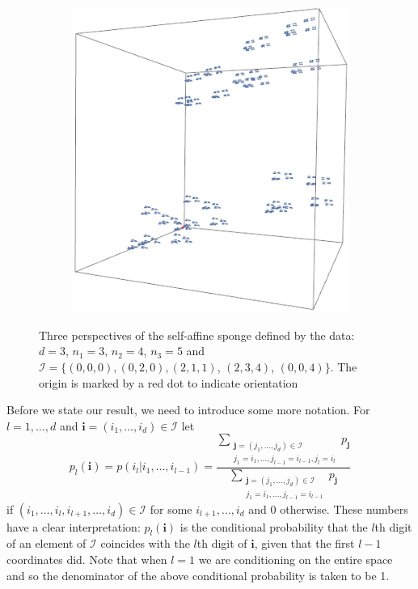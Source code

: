 \begin{figure}[h]
	\begin{subfigure}{0.35\textwidth}
		\centering
		\includegraphics[width=0.85\linewidth]{pics/ch-upper-reg/sponge13.png}
		\label{ch-upper-reg:fig:sub2}
	\end{subfigure}
	\caption{Three perspectives of the self-affine sponge defined by the data: $d=3$,  $n_1=3$, $n_2=4$, $n_3=5$ and $\mathcal{I} = \{ (0,0,0),(0,2,0),(2,1,1)$, $(2,3,4)$, $(0,0,4) \}$. The origin is marked by a red dot to indicate orientation}
\end{figure}


Before we state our result, we need to introduce some more notation.  For $l=1, \dots, d$ and $\textbf{i}=(i_1, \ldots, i_d)\in \mathcal{I} $  let 
\[
p_l(\mathbf{i})=p (i_l \vert i_1, \ldots , i_{l-1})=\frac{\displaystyle\sum_{\substack{\textbf{j}=\left( j_1, \ldots, j_d\right)\in \mathcal{I} \\ j_1=i_1, \ldots, j_{l-1}=i_{l-1}, j_l=i_l}}p_{\textbf{j}}}{\displaystyle\sum_{\substack{\textbf{j}=\left( j_1, \ldots, j_d\right)\in \mathcal{I} \\ j_1=i_1, \ldots, j_{l-1}=i_{l-1}}}p_{\textbf{j}}}
\]
if $(i_1, \ldots, i_l, i_{l+1},\ldots, i_d) \in \mathcal{I}$ for some $i_{l+1},\ldots, i_d$ and $0$ otherwise.  These numbers have a clear interpretation: $p_l(\mathbf{i})$ is the conditional probability that the $l$th digit of an element of $\mathcal{I}$  coincides with the $l$th digit of $\mathbf{i}$, given that the first $l-1$ coordinates did.  Note that when $l=1$ we are conditioning on the entire space and so the denominator of the above conditional probability is taken to be 1.


